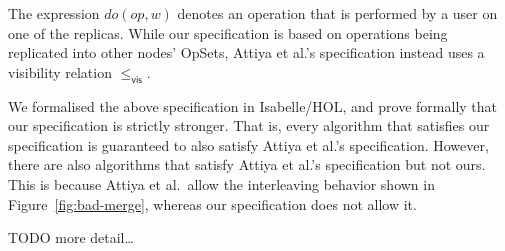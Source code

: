 The expression $\mathit{do}(\mathit{op}, w)$ denotes an operation that is performed by a user on one of the replicas.
While our specification is based on operations being replicated into other nodes' OpSets, Attiya et al.'s specification instead uses a visibility relation $\le_\textsf{vis}$.

We formalised the above specification in Isabelle/HOL, and prove formally that our specification is strictly stronger.
That is, every algorithm that satisfies our specification is guaranteed to also satisfy Attiya et al.'s specification.
However, there are also algorithms that satisfy Attiya et al.'s specification but not ours.
This is because Attiya et al.\ allow the interleaving behavior shown in Figure~\ref{fig:bad-merge}, whereas our specification does not allow it.

TODO more detail\dots
